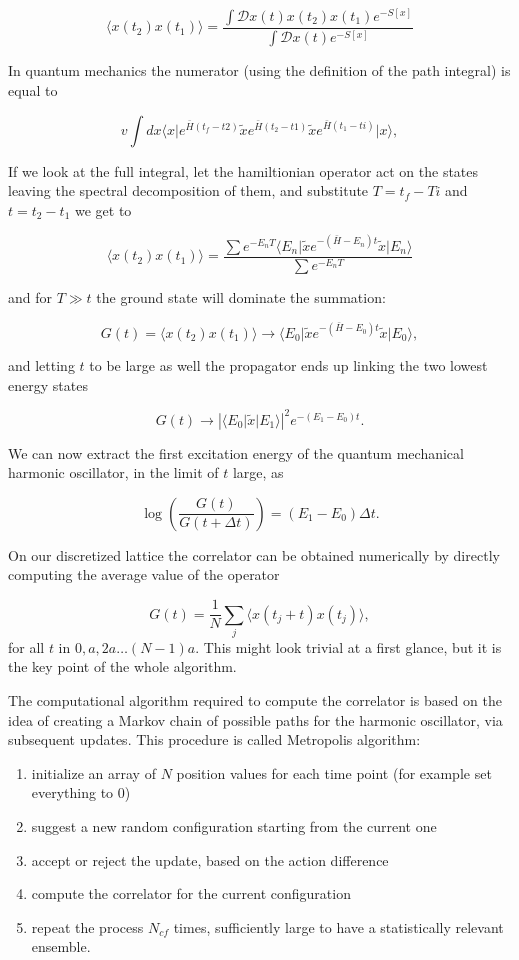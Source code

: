 \documentclass[%
oneside,                 %
final,                   %
10pt]{article}
\begin{document}
\[
	\langle x(t_2)x(t_1) \rangle = \frac{\int \mathcal{D} x(t) x(t_2) x(t_1) e^{-S[x]}}{\int \mathcal{D} x(t) e^{-S[x]}}
\]

In quantum mechanics the numerator (using the definition of the path integral) is equal to

\[	
v	\int dx \langle x\vert  e^{\bar{H}(t_f-t2)} \tilde{x} e^{\bar{H}(t_2-t1)} \tilde{x} e^{\bar{H}(t_1-ti)} \vert x\rangle,
\]

If we look at the full integral, let the hamiltionian operator act on
the states leaving the spectral decomposition of them, and substitute
$T = t_f-Ti$ and $t = t_2 - t_1$ we get to

\[
	\langle x(t_2)x(t_1) \rangle = \frac{\sum e^{-E_n T} \langle E_n\vert \tilde{x} e^{-(\bar{H}-E_n)t}  \tilde{x}\vert E_n\rangle }{\sum e^{-E_n T }}
\]

and for $T \gg t$ the ground state will dominate the summation:

\[
	G(t) = \langle x(t_2)x(t_1)\rangle \rightarrow  \langle E_0\vert \tilde{x} e^{-(\bar{H}-E_0)t}  \tilde{x}\vert E_0\rangle,
\]

and letting $t$ to be large as well the propagator ends up linking the two lowest energy states

\[
	G(t) \rightarrow  |\langle E_0\vert \tilde{x} \vert E_1\rangle|^2e^{-(E_1-E_0)t}.
\]

We can now extract the first excitation energy of the quantum mechanical harmonic oscillator, in the limit of $t$ large, as

\[
	\log\left( \frac{G(t)}{G(t+\Delta t)}\right) = (E_1 - E_0)\Delta t.
\]

On our discretized lattice the correlator can be obtained numerically by directly computing the average value of the operator

\[
	G(t) = \frac{1}{N}\sum_j\langle x(t_j+t)x(t_j)\rangle,
\]
for all $t$ in $0, a, 2a\dots (N-1)a$. This might look trivial at a first glance, but it is the key point of the whole algorithm.

The computational algorithm required to compute the correlator is
based on the idea of creating a Markov chain of possible paths for the
harmonic oscillator, via subsequent updates. This procedure is called
Metropolis algorithm:

\begin{enumerate}
\item initialize an array of $N$ position values for each time point (for example set everything to 0)

\item suggest a new random configuration starting from the current one

\item accept or reject the update, based on the action difference

\item compute the correlator for the current configuration

\item repeat the process $N_{cf}$ times, sufficiently large to have a statistically relevant ensemble.
\end{enumerate}
\end{document}

